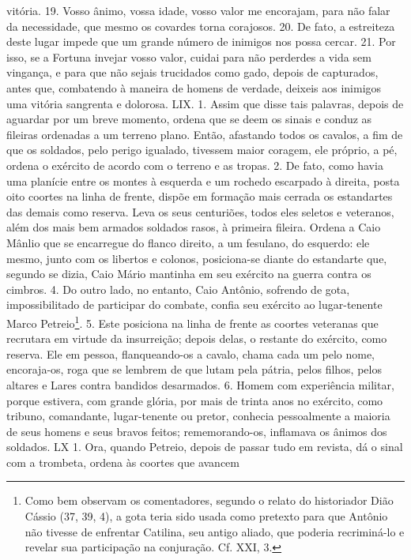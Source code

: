 vitória. 19. Vosso ânimo, vossa idade, vosso valor me encorajam, para não falar
da necessidade, que mesmo os covardes torna corajosos. 20. De fato, a
estreiteza deste lugar impede que um grande número de inimigos nos possa
cercar. 21. Por isso, se a Fortuna invejar vosso valor, cuidai para não
perderdes a vida sem vingança, e para que não sejais trucidados como gado,
depois de capturados, antes que, combatendo à maneira de homens de verdade,
deixeis aos inimigos uma vitória sangrenta e dolorosa.  LIX. 1. Assim que disse
tais palavras, depois de aguardar por um breve momento, ordena que se deem os
sinais e conduz as fileiras ordenadas a um terreno plano. Então, afastando
todos os cavalos, a fim de que os soldados, pelo perigo igualado, tivessem
maior coragem, ele próprio, a pé, ordena o exército de acordo com o terreno e
as tropas. 2. De fato, como havia uma planície entre os montes à esquerda e um
rochedo escarpado à direita, posta oito coortes na linha de frente, dispõe em
formação mais cerrada os estandartes das demais como reserva. Leva os seus
centuriões, todos eles seletos e veteranos, além dos mais bem armados soldados
rasos, à primeira fileira. Ordena a Caio Mânlio que se encarregue do flanco
direito, a um fesulano, do esquerdo: ele mesmo, junto com os libertos e
colonos, posiciona-se diante do estandarte que, segundo se dizia, Caio Mário
mantinha em seu exército na guerra contra os cimbros. 4. Do outro lado, no
entanto, Caio Antônio, sofrendo de gota, impossibilitado de participar do
combate, confia seu exército ao lugar-tenente Marco Petreio\footnote{Como bem
observam os comentadores, segundo o relato do historiador Dião Cássio (37, 39,
4), a gota teria sido usada como pretexto para que Antônio não tivesse de
enfrentar Catilina, seu antigo aliado, que poderia recriminá-lo e revelar sua
participação na conjuração. Cf. XXI, 3.}. 5. Este posiciona na linha de frente
as coortes veteranas que recrutara em virtude da insurreição; depois delas, o
restante do exército, como reserva. Ele em pessoa, flanqueando-os a cavalo,
chama cada um pelo nome, encoraja-os, roga que se lembrem de que lutam pela pátria, pelos filhos, pelos altares e Lares contra
bandidos desarmados. 6. Homem
com experiência militar, porque estivera, com grande glória, por mais de trinta
anos no exército, como tribuno, comandante, lugar-tenente ou pretor, conhecia  pessoalmente a
maioria de seus homens e seus bravos feitos; rememorando-os,
inflamava os ânimos dos soldados.  LX 1. Ora, quando Petreio, depois de passar
tudo em revista, dá o sinal com a trombeta, ordena às coortes que avancem
